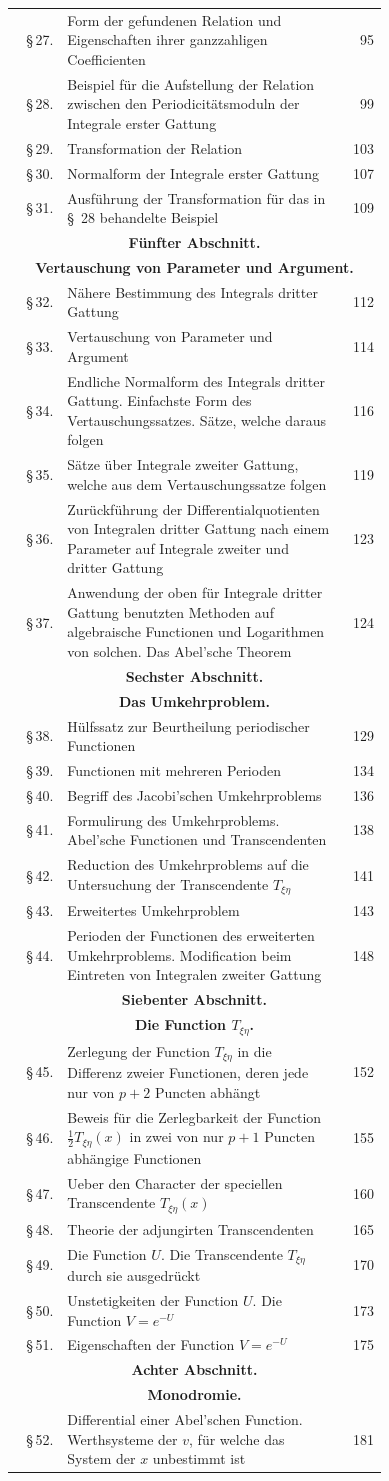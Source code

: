 \documentclass[10pt]{article}
\newcommand{\tocentry}[3]{\S\,#1 & #2 & #3\\}
\newcommand{\tocsec}[2]{\multicolumn{3}{c}{\bfseries #1}\\[-0.15em]\multicolumn{3}{c}{\bfseries #2}\\[0.25em]}
\begin{document}
{\begin{longtable}{@{}r@{\ }p{0.74\linewidth}@{\ }r@{}}
\tocentry{27.}{Form der gefundenen Relation und Eigenschaften ihrer ganzzahligen Coefficienten}{95}
\tocentry{28.}{Beispiel für die Aufstellung der Relation zwischen den Periodicitätsmoduln der Integrale erster Gattung}{99}
\tocentry{29.}{Transformation der Relation}{103}
\tocentry{30.}{Normalform der Integrale erster Gattung}{107}
\tocentry{31.}{Ausführung der Transformation für das in \S\ 28 behandelte Beispiel}{109}
\tocsec{Fünfter Abschnitt.}{Vertauschung von Parameter und Argument.}
\tocentry{32.}{Nähere Bestimmung des Integrals dritter Gattung}{112}
\tocentry{33.}{Vertauschung von Parameter und Argument}{114}
\tocentry{34.}{Endliche Normalform des Integrals dritter Gattung. Einfachste Form des Vertauschungssatzes. Sätze, welche daraus folgen}{116}
\tocentry{35.}{Sätze über Integrale zweiter Gattung, welche aus dem Vertauschungssatze folgen}{119}
\tocentry{36.}{Zurückführung der Differentialquotienten von Integralen dritter Gattung nach einem Parameter auf Integrale zweiter und dritter Gattung}{123}
\tocentry{37.}{Anwendung der oben für Integrale dritter Gattung benutzten Methoden auf algebraische Functionen und Logarithmen von solchen. Das Abel'sche Theorem}{124}
\tocsec{Sechster Abschnitt.}{Das Umkehrproblem.}
\tocentry{38.}{Hülfssatz zur Beurtheilung periodischer Functionen}{129}
\tocentry{39.}{Functionen mit mehreren Perioden}{134}
\tocentry{40.}{Begriff des Jacobi'schen Umkehrproblems}{136}
\tocentry{41.}{Formulirung des Umkehrproblems. Abel'sche Functionen und Transcendenten}{138}
\tocentry{42.}{Reduction des Umkehrproblems auf die Untersuchung der Transcendente $T_{\xi\eta}$}{141}
\tocentry{43.}{Erweitertes Umkehrproblem}{143}
\tocentry{44.}{Perioden der Functionen des erweiterten Umkehrproblems. Modification beim Eintreten von Integralen zweiter Gattung}{148}
\tocsec{Siebenter Abschnitt.}{Die Function $T_{\xi\eta}$.}
\tocentry{45.}{Zerlegung der Function $T_{\xi\eta}$ in die Differenz zweier Functionen, deren jede nur von $p+2$ Puncten abhängt}{152}
\tocentry{46.}{Beweis für die Zerlegbarkeit der Function $\frac12 T_{\xi\eta}(x)$ in zwei von nur $p+1$ Puncten abhängige Functionen}{155}
\tocentry{47.}{Ueber den Character der speciellen Transcendente $T_{\xi\eta}(x)$}{160}
\tocentry{48.}{Theorie der adjungirten Transcendenten}{165}
\tocentry{49.}{Die Function $U$. Die Transcendente $T_{\xi\eta}$ durch sie ausgedrückt}{170}
\tocentry{50.}{Unstetigkeiten der Function $U$. Die Function $V=e^{-U}$}{173}
\tocentry{51.}{Eigenschaften der Function $V=e^{-U}$}{175}
\tocsec{Achter Abschnitt.}{Monodromie.}
\tocentry{52.}{Differential einer Abel'schen Function. Werthsysteme der $v$, für welche das System der $x$ unbestimmt ist}{181}

\end{longtable}}
\end{document}
